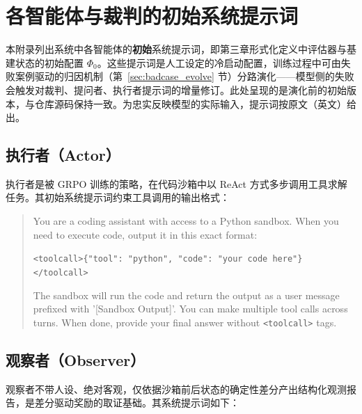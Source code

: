 \chapter{各智能体与裁判的初始系统提示词}
\label{app:prompts}

本附录列出系统中各智能体的\textbf{初始}系统提示词，即第三章形式化定义中评估器与基建状态的初始配置 $\Phi_0$。这些提示词是人工设定的冷启动配置，训练过程中可由失败案例驱动的归因机制（第~\ref{sec:badcase_evolve} 节）分路演化——模型侧的失败会触发对裁判、提问者、执行者提示词的增量修订。此处呈现的是演化前的初始版本，与仓库源码保持一致。为忠实反映模型的实际输入，提示词按原文（英文）给出。

\section{执行者（Actor）}

执行者是被 GRPO 训练的策略，在代码沙箱中以 ReAct 方式多步调用工具求解任务。其初始系统提示词约束工具调用的输出格式：

\begin{quote}\small
You are a coding assistant with access to a Python sandbox. When you need to execute code, output it in this exact format:

\texttt{<toolcall>\{"tool": "python", "code": "your code here"\}</toolcall>}

The sandbox will run the code and return the output as a user message prefixed with '[Sandbox Output]'. You can make multiple tool calls across turns. When done, provide your final answer without \texttt{<toolcall>} tags.
\end{quote}

\section{观察者（Observer）}

观察者不带人设、绝对客观，仅依据沙箱前后状态的确定性差分产出结构化观测报告，是差分驱动奖励的取证基础。其系统提示词如下：

